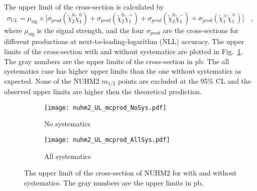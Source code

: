 The upper limit of the cross-section is calculated by
%
\begin{equation}
	\sigma_{UL} = \mu_\mathrm{sig} \times \big[ \sigma_{prod}(\widetilde{\chi}^{0}_{2} \widetilde{\chi}^{0}_{1}) + \sigma_{prod}(\widetilde{\chi}^{0}_{2} \widetilde{\chi}^{+}_{1}) + \sigma_{prod}(\widetilde{\chi}^{0}_{2} \widetilde{\chi}^{-}_{1}) + \sigma_{prod}(\widetilde{\chi}^{\pm}_{1} \widetilde{\chi}^{\mp}_{1}) \big] \quad ,
\end{equation}
%
where $\mu_\mathrm{sig}$ is the signal strength, and the four $\sigma_{prod}$ are the cross-sections for different productions at next-to-leading-logarithm (NLL) accuracy.
The upper limits of the cross-section with and without systematics are plotted in Fig.~\ref{fig:results_nuhm2_interpretation_mc_production}.
The gray numbers are the upper limits of the cross-section in pb.
The all systematics case has higher upper limits than the one without systematics as expected.
None of the NUHM2 $m_{1/2}$ points are excluded at the 95\% CL and the observed upper limits are higher then the theoretical prediction.

\begin{figure}[htbp]
    \begin{center}
        \begin{subfigure}[b]{0.48\textwidth}
            \texttt{[image: nuhm2\_UL\_mcprod\_NoSys.pdf]}
            \caption{No systematics}
        \end{subfigure}
        \begin{subfigure}[b]{0.48\textwidth}
            \texttt{[image: nuhm2\_UL\_mcprod\_AllSys.pdf]}
            \caption{All systematics}
        \end{subfigure}
    \end{center}
    \caption{The upper limit of the cross-section of NUHM2 for with and without systematics.
    The gray numbers are the upper limits in pb.}
    \label{fig:results_nuhm2_interpretation_mc_production}
\end{figure}
